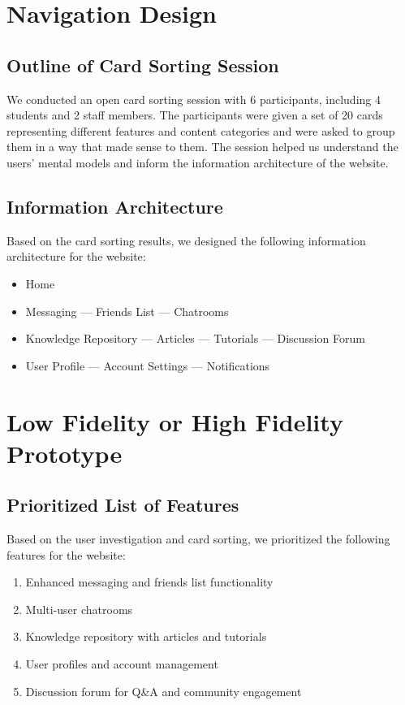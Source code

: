 \documentclass[12pt]{article}
\begin{document}
\newpage
\section{Navigation Design}
\subsection{Outline of Card Sorting Session}
We conducted an open card sorting session with 6 participants, including 4 students and 2 staff members. The participants were given a set of 20 cards representing different features and content categories and were asked to group them in a way that made sense to them. The session helped us understand the users' mental models and inform the information architecture of the website.

\subsection{Information Architecture}
Based on the card sorting results, we designed the following information architecture for the website:

\begin{itemize}
    \item Home
    \item Messaging
        \subitem — Friends List
        \subitem — Chatrooms
    \item Knowledge Repository
        \subitem — Articles
        \subitem — Tutorials
        \subitem — Discussion Forum
    \item User Profile
        \subitem — Account Settings
        \subitem — Notifications
\end{itemize}

\newpage
\section{Low Fidelity or High Fidelity Prototype}
\subsection{Prioritized List of Features}
Based on the user investigation and card sorting, we prioritized the following features for the website:

\begin{enumerate}
    \item Enhanced messaging and friends list functionality
    \item Multi-user chatrooms
    \item Knowledge repository with articles and tutorials
    \item User profiles and account management
    \item Discussion forum for Q\&A and community engagement
\end{enumerate}
\end{document}
